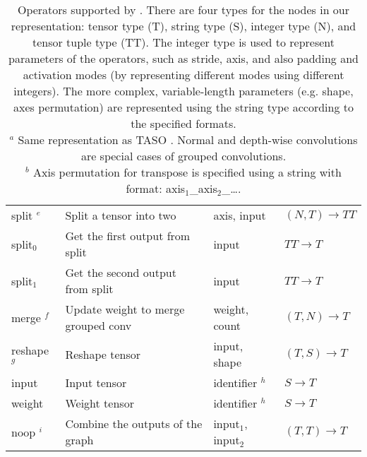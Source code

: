 \begin{table}[t]
\begin{adjustbox}{width=\linewidth}
\begin{tabular}{llll}
        split $^e$      & Split a tensor into two             & axis, input                                                 & $(N, T) \rightarrow TT$ \\
        split$_0$       & Get the first output from split     & input                                                       & $TT \rightarrow T$ \\
        split$_1$       & Get the second output from split    & input                                                       & $TT \rightarrow T$ \\
        merge $^f$      & Update weight to merge grouped conv & weight, count                                               & $(T, N) \rightarrow T$ \\
        reshape $^g$    & Reshape tensor                      & input, shape                                                & $(T, S) \rightarrow T$ \\
        input           & Input tensor                        & identifier $^h$                                             & $S \rightarrow T$ \\
        weight          & Weight tensor                       & identifier $^h$                                             & $S \rightarrow T$ \\
        noop $^i$       & Combine the outputs of the graph    & input$_1$, input$_2$                                        & $(T, T) \rightarrow T$ \\
    \hline
    \end{tabular}
    \end{adjustbox}
    \caption{
        Operators supported by \ourname.
        There are four types for the nodes in our representation:
        tensor type (T), string type (S), integer type (N), and tensor tuple type (TT).
        The integer type is used to represent parameters of the
         operators, such as stride, axis, and also padding and activation modes
         (by representing different modes using different integers).
         The more complex, variable-length parameters
          (e.g. shape, axes permutation) are represented using the
          string type according to the specified formats.
          \\
    \footnotesize{$^a$ Same representation as TASO \cite{taso}. Normal and depth-wise convolutions are special cases of grouped convolutions.} \\
    \footnotesize{$^b$ Axis permutation for transpose is specified using a string with format: axis$_1$\_axis$_2$\_\dots .}\\
}
\end{table}
